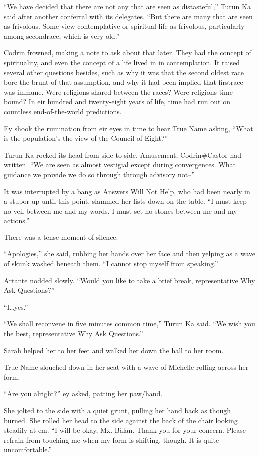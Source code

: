 ``We have decided that there are not any that are seen as distasteful,'' Turun Ka said after another conferral with its delegates. ``But there are many that are seen as frivolous. Some view contemplative or spiritual life as frivolous, particularly among secondrace, which is very old.''

Codrin frowned, making a note to ask about that later. They had the concept of spirituality, and even the concept of a life lived in in contemplation. It raised several other questions besides, such as why it was that the second oldest race bore the brunt of that assumption, and why it had been implied that firstrace was immune. Were religions shared between the races? Were religions time-bound? In eir hundred and twenty-eight years of life, time had run out on countless end-of-the-world predictions.

Ey shook the rumination from eir eyes in time to hear True Name asking, ``What is the population's the view of the Council of Eight?''

Turun Ka rocked its head from side to side. Amusement, Codrin\#Castor had written. ``We are seen as almost vestigial except during convergences. What guidance we provide we do so through through advisory not--''

It was interrupted by a bang as Answers Will Not Help, who had been nearly in a stupor up until this point, slammed her fists down on the table. ``I must keep no veil between me and my words. I must set no stones between me and my actions.''

There was a tense moment of silence.

``Apologies,'' she said, rubbing her hands over her face and then yelping as a wave of skunk washed beneath them. ``I cannot stop myself from speaking.''

Artante nodded slowly. ``Would you like to take a brief break, representative Why Ask Questions?''

``I\ldots yes.''

``We shall reconvene in five minutes common time,'' Turun Ka said. ``We wish you the best, representative Why Ask Questions.''

Sarah helped her to her feet and walked her down the hall to her room.

True Name slouched down in her seat with a wave of Michelle rolling across her form.

``Are you alright?'' ey asked, patting her paw/hand.

She jolted to the side with a quiet grunt, pulling her hand back as though burned. She rolled her head to the side against the back of the chair looking steadily at em. ``I will be okay, Mx. Bălan. Thank you for your concern. Please refrain from touching me when my form is shifting, though. It is quite uncomfortable.''

